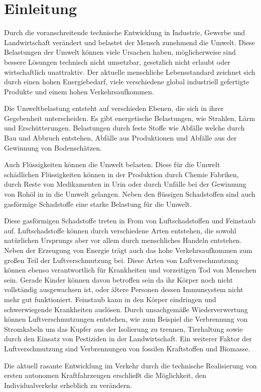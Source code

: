 \chapter{Einleitung}
Durch die voranschreitende technische Entwicklung in Industrie, Gewerbe und Landwirtschaft verändert und belastet der Mensch zunehmend die Umwelt.
Diese Belastungen der Umwelt können viele Ursachen haben,
möglicherweise sind bessere Lösungen technisch nicht umsetzbar,
gesetzlich nicht erlaubt oder wirtschaftlich unattraktiv.
Der aktuelle menschliche Lebensstandard zeichnet sich durch einen
hohen Energiebedarf, viele verschiedene global industriell gefertigte Produkte
und einem hohen Verkehrsaufkommen.

Die Umweltbelastung entsteht auf verschieden Ebenen, die sich in ihrer Gegebenheit unterscheiden.
Es gibt energetische Belastungen, wie Strahlen, Lärm und Erschütterungen.
Belastungen durch feste Stoffe wie Abfälle welche durch Bau und Abbruch entstehen,
Abfälle aus Produktionen und
Abfälle aus der Gewinnung von Bodenschätzen.

Auch Flüssigkeiten können die Umwelt belasten.
Diese für die Umwelt schädlichen Flüssigkeiten können
in der Produktion durch Chemie Fabriken,
durch Reste von Medikamenten in Urin oder durch
Unfälle bei der Gewinnung von Rohöl in in die Umwelt gelangen.
Neben den flüssigen Schadstoffen sind auch gasförmige Schadstoffe eine starke Belastung für die Umwelt.

Diese gasförmigen Schadstoffe treten in From von Luftschadstoffen und Feinstaub auf.
Luftschadstoffe können durch verschiedene Arten entstehen, die sowohl natürlichen Ursprungs aber vor allem
durch menschliches Handeln entstehen.
Neben der Erzeugung von Energie trägt auch das hohe Verkehrsaufkommen zum großen Teil der Luftverschmutzung bei.
Diese Arten von Luftverschmutzung können ebenso verantwortlich für Krankheiten und vorzeitigen Tod von Menschen sein.
Gerade Kinder können davon betroffen sein da ihr Körper noch nicht vollständig ausgewachsen ist,
oder ältere Personen dessen Immunsystem nicht mehr gut funktioniert.
Feinstaub kann in den Körper eindringen und schwerwiegende Krankheiten auslösen.
Durch unsachgemäße Wiederverwertung können Luftverschmutzungen entstehen,
wie zum Beispiel die Verbrennung von
Stromkabeln um das Kupfer aus der Isolierung zu trennen,
Tierhaltung sowie durch den Einsatz von Pestiziden in der Landwirtschaft.
Ein weiterer Faktor der Luftverschmutzung sind Verbrennungen von fossilen Kraftstoffen und Biomasse.

Die aktuell rasante Entwicklung im Verkehr durch die technische Realisierung von ersten autonomen Kraftfahrzeugen
erschließt die Möglichkeit, den Individualverkehr erheblich zu verändern.

